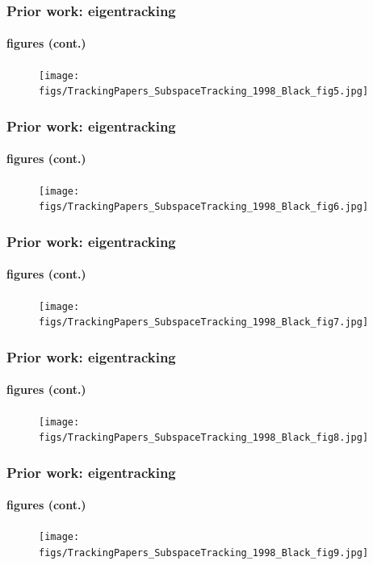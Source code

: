 \begin{frame}
\frametitle{Prior work: eigentracking}
\framesubtitle{figures (cont.)}
\logoCSIPCPL\mypagenum
	\begin{figure}
		\texttt{[image: figs/TrackingPapers\_SubspaceTracking\_1998\_Black\_fig5.jpg]}
	\end{figure}
\end{frame}




\begin{frame}
\frametitle{Prior work: eigentracking}
\framesubtitle{figures (cont.)}
\logoCSIPCPL\mypagenum
	\begin{figure}
		\texttt{[image: figs/TrackingPapers\_SubspaceTracking\_1998\_Black\_fig6.jpg]}
	\end{figure}
\end{frame}




\begin{frame}
\frametitle{Prior work: eigentracking}
\framesubtitle{figures (cont.)}
\logoCSIPCPL\mypagenum
	\begin{figure}
		\texttt{[image: figs/TrackingPapers\_SubspaceTracking\_1998\_Black\_fig7.jpg]}
	\end{figure}
\end{frame}



\begin{frame}
\frametitle{Prior work: eigentracking}
\framesubtitle{figures (cont.)}
\logoCSIPCPL\mypagenum
	\begin{figure}
		\texttt{[image: figs/TrackingPapers\_SubspaceTracking\_1998\_Black\_fig8.jpg]}
	\end{figure}
\end{frame}



\begin{frame}
\frametitle{Prior work: eigentracking}
\framesubtitle{figures (cont.)}
\logoCSIPCPL\mypagenum
	\begin{figure}
		\texttt{[image: figs/TrackingPapers\_SubspaceTracking\_1998\_Black\_fig9.jpg]}
	\end{figure}
\end{frame}





